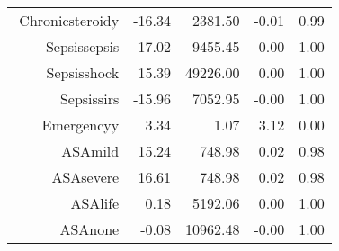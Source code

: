 \begin{tabular}{rrrrr}
$$  Chronic\-steroid\-y & -16.34 & 2381.50 & -0.01 & 0.99 \\ 
  Sepsis\-sepsis & -17.02 & 9455.45 & -0.00 & 1.00 \\ 
  Sepsis\-shock & 15.39 & 49226.00 & 0.00 & 1.00 \\ 
  Sepsis\-sirs & -15.96 & 7052.95 & -0.00 & 1.00 \\ 
  Emergency\-y & 3.34 & 1.07 & 3.12 & 0.00 \\ 
  ASA\-mild & 15.24 & 748.98 & 0.02 & 0.98 \\ 
  ASA\-severe & 16.61 & 748.98 & 0.02 & 0.98 \\ 
  ASA\-life & 0.18 & 5192.06 & 0.00 & 1.00 \\ 
  ASA\-none & -0.08 & 10962.48 & -0.00 & 1.00 \\ 
   \hline
\end{tabular}

